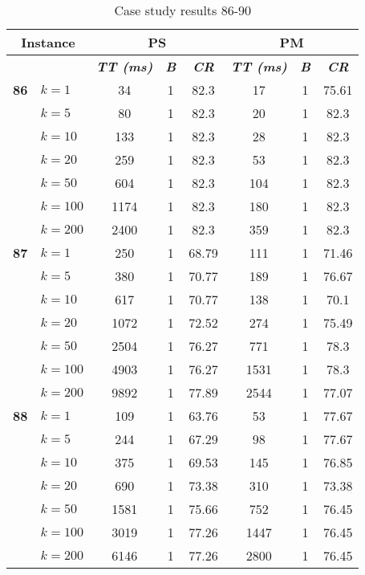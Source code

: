     \begin{table}[htbp]
    \caption{Case study results 86-90}
    \centering
    \begin{tabular}{|l|l|c|c|c|c|c|c|}
    \hline
    \multicolumn{ 2}{|c|}{\textbf{Instance}} & \multicolumn{ 3}{c|}{\textbf{PS}} & \multicolumn{ 3}{c|}{\textbf{PM}} \\ \hline
    \multicolumn{ 2}{|l|}{} & \textbf{\textit{TT (ms)}} & \textbf{\textit{B}} & \textbf{\textit{CR}} & \textbf{\textit{TT (ms)}} & \textbf{\textit{B}} & \textbf{\textit{CR}} \\ \hline
    \multicolumn{1}{|r|}{\textbf{86}} & $k=1$ & 34 & 1 & 82.3 & 17 & 1 & 75.61 \\ 
     & $k=5$ & 80 & 1 & 82.3 & 20 & 1 & 82.3 \\ 
     & $k=10$ & 133 & 1 & 82.3 & 28 & 1 & 82.3 \\ 
     & $k=20$ & 259 & 1 & 82.3 & 53 & 1 & 82.3 \\ 
     & $k=50$ & 604 & 1 & 82.3 & 104 & 1 & 82.3 \\ 
     & $k=100$ & 1174 & 1 & 82.3 & 180 & 1 & 82.3 \\ 
     & $k=200$ & 2400 & 1 & 82.3 & 359 & 1 & 82.3 \\ \hline
    \multicolumn{1}{|r|}{\textbf{87}} & $k=1$ & 250 & 1 & 68.79 & 111 & 1 & 71.46 \\ 
     & $k=5$ & 380 & 1 & 70.77 & 189 & 1 & 76.67 \\ 
     & $k=10$ & 617 & 1 & 70.77 & 138 & 1 & 70.1 \\ 
     & $k=20$ & 1072 & 1 & 72.52 & 274 & 1 & 75.49 \\ 
     & $k=50$ & 2504 & 1 & 76.27 & 771 & 1 & 78.3 \\ 
     & $k=100$ & 4903 & 1 & 76.27 & 1531 & 1 & 78.3 \\ 
     & $k=200$ & 9892 & 1 & 77.89 & 2544 & 1 & 77.07 \\ \hline
    \multicolumn{1}{|r|}{\textbf{88}} & $k=1$ & 109 & 1 & 63.76 & 53 & 1 & 77.67 \\ 
     & $k=5$ & 244 & 1 & 67.29 & 98 & 1 & 77.67 \\ 
     & $k=10$ & 375 & 1 & 69.53 & 145 & 1 & 76.85 \\ 
     & $k=20$ & 690 & 1 & 73.38 & 310 & 1 & 73.38 \\ 
     & $k=50$ & 1581 & 1 & 75.66 & 752 & 1 & 76.45 \\ 
     & $k=100$ & 3019 & 1 & 77.26 & 1447 & 1 & 76.45 \\ 
     & $k=200$ & 6146 & 1 & 77.26 & 2800 & 1 & 76.45 \\ \hline

\end{tabular}
\end{table}
